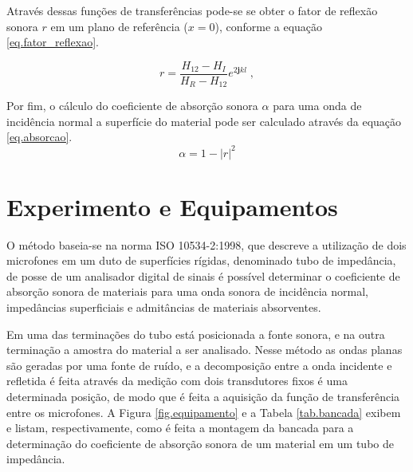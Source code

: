
Através dessas funções de transferências pode-se se obter o fator de reflexão sonora $r$ em um plano de referência ($x=0$), conforme a equação \ref{eq.fator_reflexao}.

\begin{equation}
r=\frac{H_{12}-H_{I}}{H_{R}-H_{12}}e^{2\textbf{j}kl}\;,
\label{eq.fator_reflexao}
\end{equation}

Por fim, o cálculo do coeficiente de absorção sonora $\alpha$ para uma onda de incidência normal a superfície do material pode ser calculado através da equação \ref{eq.absorcao}.
\begin{equation}
\alpha=1-|r|^{2}
\label{eq.absorcao}
\end{equation} 

\chapter{Experimento e Equipamentos}\label{descricao}

O método baseia-se na norma ISO 10534-2:1998, que descreve a utilização de dois microfones em um duto de superfícies rígidas, denominado tubo de impedância, de posse de um analisador digital de sinais é possível determinar o coeficiente de absorção sonora de materiais para uma onda sonora de incidência normal, impedâncias superficiais e admitâncias de materiais absorventes.  

Em uma das terminações do tubo está posicionada a fonte sonora, e na outra terminação a amostra do material a ser analisado. Nesse método as ondas planas são geradas por uma fonte de ruído, e a decomposição entre a onda incidente e refletida é feita através da medição com dois transdutores fixos é uma determinada posição, de modo que é feita a aquisição da função de transferência entre os microfones. A Figura \ref{fig.equipamento} e a Tabela \ref{tab.bancada} exibem e listam, respectivamente, como é feita a montagem da bancada para a determinação do coeficiente de absorção sonora de um material em um tubo de impedância.

